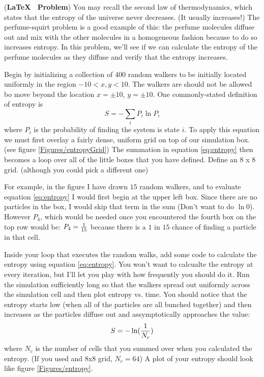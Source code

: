 \begin{enumerate}
  \prob (\textbf{\LaTeX ~ Problem}) You may recall the second law of thermodynamics, which states
  that the entropy of the universe never decreases. (It usually
  increases!) The perfume-squirt problem is a good example of this: the
  perfume molecules diffuse out and mix with the other molecules in a
  homogeneous fashion because to do so increases entropy.  In this
  problem, we'll see if we can calculate the entropy of the perfume
  molecules as they diffuse and verify that the entropy increases.

\begin{enumerate}
\subprob Begin by initializing a collection of $400$ random walkers to
be initially located uniformly in the region $-10 < x,y < 10$. The
walkers are should not be allowed bo move beyond the location $x = \pm 10$, $y = \pm 10$.  
\subprob One commonly-stated definition of entropy is 
\begin{equation}\label{eq:entropy}
S = - \sum_i P_i \ln P_i
\end{equation}
where $P_i$ is the probability of finding the system is state $i$.
To apply this equation we must first overlay a fairly dense, uniform grid on top of
our simulation box. (see figure \ref{Figures/entropyGrid}) The summation in equation
\eqref{eq:entropy} then becomes a loop over all of the little boxes
that you have defined. Define an $8$ x $8$ grid. (although you could
pick a different one) 

For example, in the figure I have drawn $15$ random walkers, and to
evaluate equation \eqref{eq:entropy} I would first begin at the upper
left box.  Since there are no particles in the box, I would skip that
term in the sum (Don't want to do $\ln 0$).  However $P_4$, which
would be needed once you encountered the fourth box on the top row
would be: $P_4 = {1\over 15}$ because there is a $1$ in $15$ chance of
finding a particle in that cell.

\subprob Inside your loop that executes the
random walks, add some code to calculate the entropy using equation
\eqref{eq:entropy}.  You won't want to calcualte the entropy at every
iteration, but I'll let you play with how frequently you should do it.
\subprob  Run the simulation sufficiently long so that the walkers
spread out uniformly across the simulation cell and then plot entropy
vs. time.  You should notice that the entropy starts low (when all of
the particles are all bunched together) and then increases as the
particles diffuse out and assymptotically approaches the value:
\begin{equation}
S = - \ln({1\over N_c})
\end{equation}
where $N_c$ is the number of cells that you summed over when you
calculated the entropy.  (If you used and 8x8 grid, $N_c = 64$)
A plot of your entropy should look like figure  \ref{Figures/entropy}.
\end{enumerate}
\end{enumerate}

